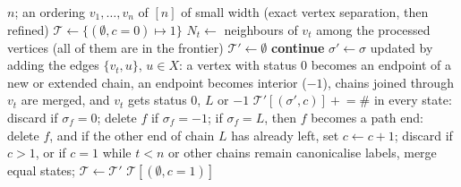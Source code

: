 \begin{algorithm}[h]
\caption{Frontier dynamic program for $\Ham(n)$ along a pathwidth ordering}\label{alg:frontier}
\begin{algorithmic}[1]
\Require $n$; an ordering $v_1,\dots,v_n$ of $[n]$ of small width (exact vertex separation, then refined)
\State $\mathcal T\gets\{(\emptyset,c{=}0)\mapsto1\}$ 
  \State $N_t\gets$ neighbours of $v_t$ among the processed vertices (all of them are in the frontier)
  \State $\mathcal T'\gets\emptyset$
     
       \textbf{continue} \EndIf
      \State $\sigma'\gets\sigma$ updated by adding the edges $\{v_t,u\}$, $u\in X$: a vertex with
      \State \hspace{1.2em} status $0$ becomes an endpoint of a new or extended chain, an endpoint becomes
      \State \hspace{1.2em} interior ($-1$), chains joined through $v_t$ are merged, and $v_t$ gets status $0$, $L$ or $-1$
      \State $\mathcal T'[(\sigma',c)]\mathrel{+}=\#$
    \EndFor
  \EndFor
   
    \State in every state: discard if $\sigma_f=0$; delete $f$ if $\sigma_f=-1$;
    \State \hspace{1.2em} if $\sigma_f=L$, then $f$ becomes a path end: delete $f$, and if the other end of chain $L$
    \State \hspace{1.2em} has already left, set $c\gets c+1$; discard if $c>1$, or if $c=1$ while
    \State \hspace{1.2em} $t<n$ or other chains remain
  \EndFor
  \State canonicalise labels, merge equal states; $\mathcal T\gets\mathcal T'$
\EndFor
\State \Return $\mathcal T[(\emptyset,c{=}1)]$ 
\end{algorithmic}
\end{algorithm}

